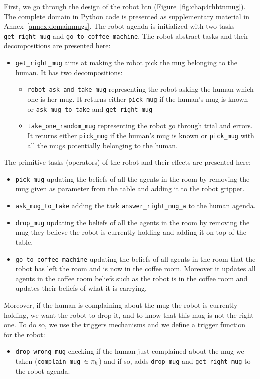 \documentclass[a4paper,11pt,twoside]{StyleThese}
\begin{document}
First, we go through the design of the robot \acrshort{htn} (Figure~\ref{fig:chap4rhhtnmug}). The complete domain in Python code is presented as supplementary material in Annex~\ref{annex:domainmugs}. The robot agenda is initialized with two tasks \verb'get_right_mug' and \verb'go_to_coffee_machine'. The robot abstract tasks and their decompositions are presented here:
\begin{itemize}
\item \verb'get_right_mug' aims at making the robot pick the mug belonging to the human. It has two decompositions:
	\begin{itemize}
	\item \verb'robot_ask_and_take_mug' representing the robot asking the human which one is her mug. It returns either \verb'pick_mug' if the human's mug is known or \verb'ask_mug_to_take' and \verb'get_right_mug'
	\item \verb'take_one_random_mug' representing the robot go through trial and errors. It returns either \verb'pick_mug' if the human's mug is known or \verb'pick_mug' with all the mugs potentially belonging to the human.
	\end{itemize}
\end{itemize}
The primitive tasks (operators) of the robot and their effects are presented here:
\begin{itemize}
\item \verb'pick_mug' updating the beliefs of all the agents in the room by removing the mug given as parameter from the table and adding it to the robot gripper.
\item \verb'ask_mug_to_take' adding the task \verb'answer_right_mug_a' to the human agenda.
\item \verb'drop_mug' updating the beliefs of all the agents in the room by removing the mug they believe the robot is currently holding and adding it on top of the table.
\item \verb'go_to_coffee_machine' updating the beliefs of all agents in the room that the robot has left the room and is now in the coffee room. Moreover it updates all agents in the coffee room beliefs such as the robot is in the coffee room and updates their beliefs of what it is carrying.
\end{itemize}
Moreover, if the human is complaining about the mug the robot is currently holding, we want the robot to drop it, and to know that this mug is not the right one. To do so, we use the triggers mechanisms and we define a trigger function for the robot:
\begin{itemize}
\item \verb'drop_wrong_mug' checking if the human just complained about the mug we taken (\verb'complain_mug'~$\in \pi_h$) and if so, adds \verb'drop_mug' and \verb'get_right_mug' to the robot agenda.
\end{itemize}
\end{document}
